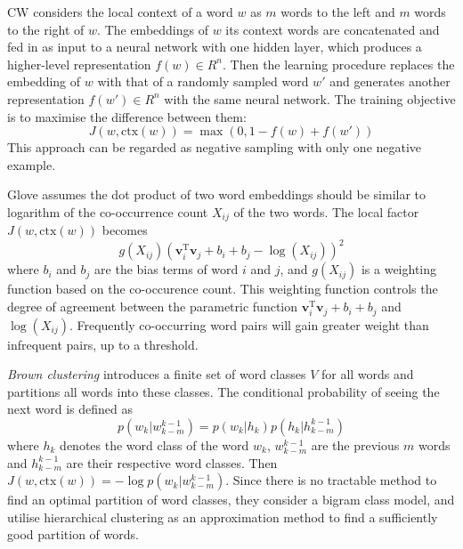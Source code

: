 CW considers the local context of a word $w$ as $m$ words to the left and $m$ words to the right of $w$. The embeddings of $w$ its context words are concatenated and fed in as input to a neural network with one hidden layer, which produces a higher-level representation $f(w) \in R^n$. Then the learning procedure replaces the embedding of $w$ with that of a randomly sampled word $w'$ and generates another representation $f(w') \in R^n$ with the same neural network. The training objective is to maximise the difference between them:
\begin{displaymath}
J(w, \text{ctx}(w)) = \max (0, 1 - f(w) + f(w'))
\end{displaymath}
This approach can be regarded as negative sampling with only one negative example.

Glove assumes the dot product of two word embeddings should be similar to logarithm of the co-occurrence count $X_{ij}$ of the two words. The local factor $J(w, \text{ctx}(w))$ becomes
\begin{displaymath}
g(X_{ij}) (\mathbf{v}_i^{\text{T}} \mathbf{v}_j + b_i + b_j - \log(X_{ij}))^2
\end{displaymath}
where $b_i$ and $b_j$ are the bias terms of word $i$ and $j$, and $g(X_{ij})$ is a weighting function based on the co-occurence count. This weighting function controls the degree of agreement between the parametric function $\mathbf{v}_i^{\text{T}} \mathbf{v}_j + b_i + b_j $ and $\log(X_{ij})$. Frequently co-occurring word pairs will gain greater weight than infrequent pairs, up to a threshold.

\textit{Brown clustering} introduces a finite set of word classes $V$ for all words and partitions all words into these classes. The conditional probability of seeing the next word is defined as
\begin{displaymath}
p(w_k | w_{k - m}^{k -1}) = p(w_k | h_k) p(h_k | h_{k - m}^{k -1})
\end{displaymath}
where $h_k$ denotes the word class of the word $w_k$, $w_{k - m}^{k -1}$ are the previous $m$ words and $h_{k - m}^{k -1}$ are their respective word classes. Then $J(w, \text{ctx}(w)) = - \log p(w_k | w_{k - m}^{k -1}) $. Since there is no tractable method to find an optimal partition of word classes, they consider a bigram class model, and utilise hierarchical clustering as an approximation method to find a sufficiently good partition of words. 

